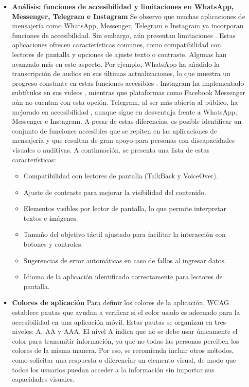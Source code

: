 \documentclass[lettersize,journal]{IEEEtran}
\begin{document}
\begin{itemize}
		
		\item \textbf{Análisis: funciones de accesibilidad y limitaciones en WhatsApp, Messenger, Telegram e Instagram} Se observo que muchas aplicaciones de mensajería como WhatsApp, Messenger, Telegram e Instagram ya incorporan funciones de accesibilidad. Sin embargo, aún presentan limitaciones \cite{Zahida2021,Swati2021,Rumini2019}. Estas aplicaciones ofrecen características comunes, como compatibilidad con lectores de pantalla y opciones de ajuste texto o contraste.
		Algunas han avanzado más en este aspecto. Por ejemplo, WhatsApp ha añadido la transcripción de audios en sus últimas actualizaciones, lo que muestra un progreso constante en estas funciones accesibles \cite{Meta2025}. Instagram ha implementado subtítulos en sus videos \cite{Meta2025}, mientras que plataformas como Facebook Messenger aún no cuentan con esta opción. Telegram, al ser más abierta al público, ha mejorado en accesibilidad \cite{telegram2025}, aunque sigue en desventaja frente a WhatsApp, Messenger e Instagram.
		A pesar de estas diferencias, es posible identificar un conjunto de funciones accesibles que se repiten en las aplicaciones de mensajería y que resultan de gran apoyo para personas con discapacidades visuales o auditivas. A continuación, se presenta una lista de estas características:
		

		\begin{itemize}
			\item Compatibilidad con lectores de pantalla (TalkBack y VoiceOver).
			\item Ajuste de contraste para mejorar la visibilidad del contenido.
			\item Elementos visibles por lector de pantalla, lo que permite interpretar textos e imágenes.
			\item Tamaño del objetivo táctil ajustado para facilitar la interacción con botones y controles.
			\item Sugerencias de error automáticas en caso de fallos al ingresar datos.
			\item Idioma de la aplicación identificado correctamente para lectores de pantalla.
		\end{itemize}
		
		\item \textbf{Colores de aplicación} 
		\noindent Para definir los colores de la aplicación, WCAG establece pautas que ayudan a verificar si el color usado es adecuado para la accesibilidad en una aplicación móvil. Estas pautas \cite{WCAG22} se organizan en tres niveles: A, AA y AAA. El nivel A indica que no se debe usar únicamente el color para transmitir información, ya que no todas las personas perciben los colores de la misma manera. Por eso, se recomienda incluir otros métodos, como solicitar una respuesta o diferenciar un elemento visual, de modo que todos los usuarios puedan acceder a la información sin importar sus capacidades visuales.
		

\end{itemize}
\end{document}
